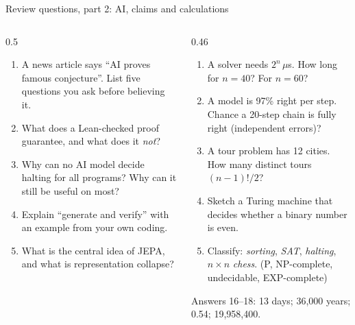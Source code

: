 \begin{frame}{Review questions, part 2: AI, claims and calculations}
\begin{columns}[T]
\begin{column}{0.5\textwidth}
\small
\begin{enumerate}\setlength\itemsep{2.5mm}
\item[11.] A news article says ``AI proves famous conjecture''. List five questions you ask before believing it.
\item[12.] What does a Lean-checked proof guarantee, and what does it \emph{not}?
\item[13.] Why can no AI model decide halting for all programs? Why can it still be useful on most?
\item[14.] Explain ``generate and verify'' with an example from your own coding.
\item[15.] What is the central idea of JEPA, and what is representation collapse?
\end{enumerate}
\end{column}
\begin{column}{0.46\textwidth}
\small
\begin{enumerate}\setlength\itemsep{2.5mm}
\item[16.] A solver needs $2^n\,\mu$s. How long for $n=40$? For $n=60$?
\item[17.] A model is 97\% right per step. Chance a 20-step chain is fully right (independent errors)?
\item[18.] A tour problem has 12 cities. How many distinct tours $(n-1)!/2$?
\item[19.] Sketch a Turing machine that decides whether a binary number is even.
\item[20.] Classify: \emph{sorting}, \emph{SAT}, \emph{halting}, $n\times n$ \emph{chess}. (P, NP-complete, undecidable, EXP-complete)
\end{enumerate}
\vspace{1mm}
{\tiny Answers 16--18: 13 days; 36,000 years; 0.54; 19,958,400.}
\end{column}
\end{columns}
\end{frame}


